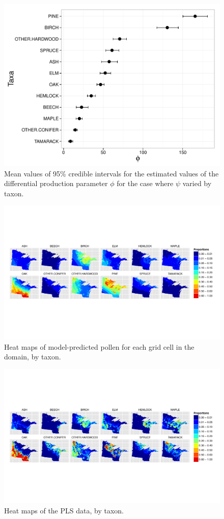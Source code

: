 \begin{figure}
\centering
\includegraphics[width=7in]{figures/phi_vary_psi.pdf}
\caption{Mean values of 95\% credible intervals for the estimated values of the differential production parameter $\phi$ for the case where $\psi$ varied by taxon.}
\label{fig:phi_vary_psi}
\end{figure}

\begin{figure}
\centering
\includegraphics[width=7in]{figures/maps_pollen.pdf}
\caption{Heat maps of model-predicted pollen for each grid cell in the domain, by taxon.}
\label{fig:maps_pollen}
\end{figure}

\begin{figure}
\centering
\includegraphics[width=7in]{figures/maps_veg.pdf}
\caption{Heat maps of the PLS data, by taxon.}
\label{fig:maps_veg}
\end{figure}





